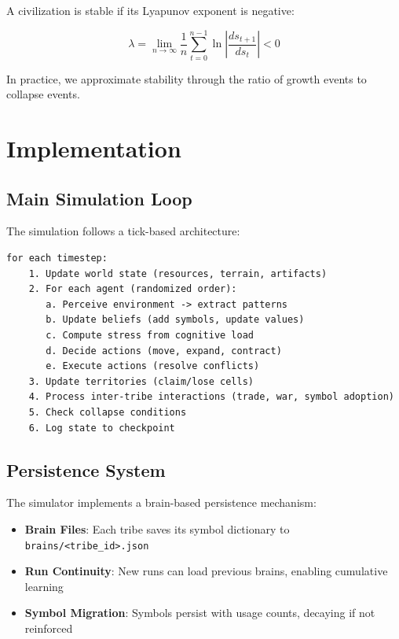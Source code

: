 \documentclass[11pt,a4paper]{article}
\begin{document}
A civilization is stable if its Lyapunov exponent is negative:

\begin{equation}
\lambda = \lim_{n \to \infty} \frac{1}{n} \sum_{t=0}^{n-1} \ln \left| \frac{d s_{t+1}}{d s_t} \right| < 0
\end{equation}

In practice, we approximate stability through the ratio of growth events to collapse events.

\section{Implementation}

\subsection{Main Simulation Loop}

The simulation follows a tick-based architecture:

\begin{verbatim}
for each timestep:
    1. Update world state (resources, terrain, artifacts)
    2. For each agent (randomized order):
       a. Perceive environment -> extract patterns
       b. Update beliefs (add symbols, update values)
       c. Compute stress from cognitive load
       d. Decide actions (move, expand, contract)
       e. Execute actions (resolve conflicts)
    3. Update territories (claim/lose cells)
    4. Process inter-tribe interactions (trade, war, symbol adoption)
    5. Check collapse conditions
    6. Log state to checkpoint
\end{verbatim}

\subsection{Persistence System}

The simulator implements a brain-based persistence mechanism:

\begin{itemize}
    \item \textbf{Brain Files}: Each tribe saves its symbol dictionary to \texttt{brains/<tribe\_id>.json}
    \item \textbf{Run Continuity}: New runs can load previous brains, enabling cumulative learning
    \item \textbf{Symbol Migration}: Symbols persist with usage counts, decaying if not reinforced
\end{itemize}
\end{document}

